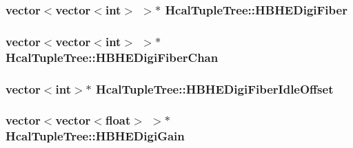 \subsubsection[{H\+B\+H\+E\+Digi\+Fiber}]{\setlength{\rightskip}{0pt plus 5cm}vector$<$vector$<$int$>$ $>$$\ast$ Hcal\+Tuple\+Tree\+::\+H\+B\+H\+E\+Digi\+Fiber}\label{class_hcal_tuple_tree_ae14f61c3fa4bc10c7ca6bd3da8d35efb}
\hypertarget{class_hcal_tuple_tree_a227e7a0df2915b2349bbfb0b5dc7d9c2}{}
\subsubsection[{H\+B\+H\+E\+Digi\+Fiber\+Chan}]{\setlength{\rightskip}{0pt plus 5cm}vector$<$vector$<$int$>$ $>$$\ast$ Hcal\+Tuple\+Tree\+::\+H\+B\+H\+E\+Digi\+Fiber\+Chan}\label{class_hcal_tuple_tree_a227e7a0df2915b2349bbfb0b5dc7d9c2}
\hypertarget{class_hcal_tuple_tree_aaf4a8badc474e66b2f2918cfd80b5a2a}{}
\subsubsection[{H\+B\+H\+E\+Digi\+Fiber\+Idle\+Offset}]{\setlength{\rightskip}{0pt plus 5cm}vector$<$int$>$$\ast$ Hcal\+Tuple\+Tree\+::\+H\+B\+H\+E\+Digi\+Fiber\+Idle\+Offset}\label{class_hcal_tuple_tree_aaf4a8badc474e66b2f2918cfd80b5a2a}
\hypertarget{class_hcal_tuple_tree_a2bb6e71cd46bf0e2fdbccce0d141d506}{}
\subsubsection[{H\+B\+H\+E\+Digi\+Gain}]{\setlength{\rightskip}{0pt plus 5cm}vector$<$vector$<$float$>$ $>$$\ast$ Hcal\+Tuple\+Tree\+::\+H\+B\+H\+E\+Digi\+Gain}\label{class_hcal_tuple_tree_a2bb6e71cd46bf0e2fdbccce0d141d506}
\hypertarget{class_hcal_tuple_tree_ac80f55cd8338af07ad6e76357e2bdc02}{}

